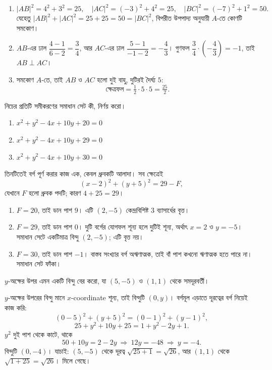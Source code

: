 \documentclass[11pt]{article}
\begin{document}
\begin{sol}
\begin{enumerate}
  \item
        \[
          |AB|^2 = 4^2 + 3^2 = 25, \quad
          |AC|^2 = (-3)^2 + 4^2 = 25, \quad
          |BC|^2 = (-7)^2 + 1^2 = 50 .
        \]
        যেহেতু $|AB|^2 + |AC|^2 = 25 + 25 = 50 = |BC|^2$, বিপরীত উপপাদ্য
        অনুযায়ী $A$-তে কোণটি সমকোণ।
  \item $AB$-এর ঢাল $\dfrac{4-1}{6-2} = \dfrac{3}{4}$, আর $AC$-এর ঢাল
        $\dfrac{5-1}{-1-2} = -\dfrac{4}{3}$। গুণফল
        $\dfrac{3}{4} \cdot \left(-\dfrac{4}{3}\right) = -1$, তাই
        $AB \perp AC$।
  \item সমকোণ $A$-তে, তাই $AB$ ও $AC$ হলো দুই বাহু, দুটিরই দৈর্ঘ্য $5$:
        \[
          \text{ক্ষেত্রফল} = \tfrac{1}{2} \cdot 5 \cdot 5 = \tfrac{25}{2} .
        \]
\end{enumerate}
\end{sol}

 নিচের প্রতিটি সমীকরণের সমাধান সেট কী, নির্ণয় করো।
\begin{enumerate}
  \item $x^2 + y^2 - 4x + 10y + 20 = 0$
  \item $x^2 + y^2 - 4x + 10y + 29 = 0$
  \item $x^2 + y^2 - 4x + 10y + 30 = 0$
\end{enumerate}

\begin{sol}
তিনটিতেই বর্গ পূর্ণ করার কাজ এক, কেবল ধ্রুবকটি আলাদা। সব ক্ষেত্রেই
\[
  (x - 2)^2 + (y + 5)^2 = 29 - F ,
\]
যেখানে $F$ হলো ধ্রুবক পদটি; কারণ $4 + 25 = 29$।

\begin{enumerate}
  \item $F = 20$, তাই ডান পাশ $9$। এটি $(2, -5)$ কেন্দ্রবিশিষ্ট $3$
        ব্যাসার্ধের বৃত্ত।
  \item $F = 29$, তাই ডান পাশ $0$। দুটি বর্গের যোগফল শূন্য হলে দুটিই শূন্য,
        অর্থাৎ $x = 2$ ও $y = -5$। সমাধান সেটে একটিমাত্র বিন্দু $(2,-5)$;
        এটি বৃত্ত নয়।
  \item $F = 30$, তাই ডান পাশ $-1$। বাস্তব সংখ্যার বর্গ অঋণাত্মক, তাই বাঁ
        পাশ কখনো ঋণাত্মক হতে পারে না। সমাধান সেট ফাঁকা।
\end{enumerate}
\end{sol}

 $y$-অক্ষের উপর এমন একটি বিন্দু বের করো, যা $(5, -5)$ ও $(1, 1)$
থেকে সমদূরবর্তী।

\begin{sol}
$y$-অক্ষের উপরের বিন্দু মানে $x$-coordinate শূন্য, তাই বিন্দুটি $(0, y)$।
বর্গমূল এড়াতে দূরত্বের বর্গ নিয়েই কাজ করি:
\[
  (0-5)^2 + (y+5)^2 = (0-1)^2 + (y-1)^2 ,
\]
\[
  25 + y^2 + 10y + 25 = 1 + y^2 - 2y + 1 .
\]
$y^2$ দুই পাশ থেকে কাটে, থাকে
\[
  50 + 10y = 2 - 2y \ \Longrightarrow\ 12y = -48 \ \Longrightarrow\ y = -4 .
\]
বিন্দুটি $(0, -4)$। যাচাই: $(5,-5)$ থেকে দূরত্ব $\sqrt{25 + 1} = \sqrt{26}$,
আর $(1,1)$ থেকে $\sqrt{1 + 25} = \sqrt{26}$। মিলে গেছে।
\end{sol}
\end{document}
